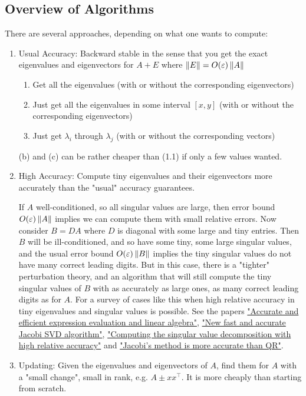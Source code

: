 \documentclass[11pt]{article}
\numberwithin{equation}{section}
\begin{document}
\subsection{Overview of Algorithms}
There are several approaches, depending on what one wants to compute:\begin{enumerate}
    \item Usual Accuracy: Backward stable in the sense that you get the exact eigenvalues and eigenvectors for $A+E$ where $\left\| E \right\| = O(\varepsilon)\left\| A \right\|$
    \begin{enumerate}
        \item Get all the eigenvalues (with or without the corresponding eigenvectors)
        \item Just get all the eigenvalues in some interval $[x,y]$ (with or without the corresponding eigenvectors)
        \item Just get $\lambda_i$ through $\lambda_j$ (with or without the corresponding vectors)
    \end{enumerate}
    (b) and (c) can be rather cheaper than (1.1) if only a few values wanted.
    \item High Accuracy: Compute tiny eigenvalues and their eigenvectors more accurately than the "usual" accuracy guarantees.
    \begin{example}
        If $A$ well-conditioned, so all singular values are large, then error bound $O(\varepsilon)\left\| A \right\|$ implies we can compute them with small relative errors.
        Now consider $B = DA$ where $D$ is diagonal with some large and tiny entries. Then $B$ will be ill-conditioned, and so have some tiny, some large singular values,
        and the usual error bound $O(\varepsilon)\left\| B \right\|$ implies the tiny singular values do not have many correct leading digits.
        But in this case, there is a "tighter" perturbation theory, and an algorithm that will still compute the tiny singular values of $B$ with as accurately as large ones, 
        as many correct leading digits as for $A$. For a survey of cases like this when high relative accuracy in tiny eigenvalues and singular values is possible.
        See the papers \href{https://www.researchgate.net/profile/Ioana_Dumitriu2/publication/1904824_Accurate_and_Efficient_Expression_Evaluation_and_Linear_Algebra/links/0c9605375576439d8f000000.pdf}{"Accurate and efficient expression evaluation and linear algebra"},
        \href{https://epubs.siam.org/doi/pdf/10.1137/050639193}{"New fast and accurate Jacobi SVD algorithm"}, 
        \href{http://dedekind.mit.edu/~plamen/talks/src99.pdf}{"Computing the singular value decomposition with high relative accuracy"} and 
        \href{https://epubs.siam.org/doi/pdf/10.1137/0613074}{"Jacobi's method is more accurate than QR"}.
    \end{example}
    \item Updating: Given the eigenvalues and eigenvectors of $A$, find them for $A$ with a "small change", small in rank, e.g. $A \pm xx^\top$. It is more cheaply than starting from scratch.
\end{enumerate}
\end{document}
